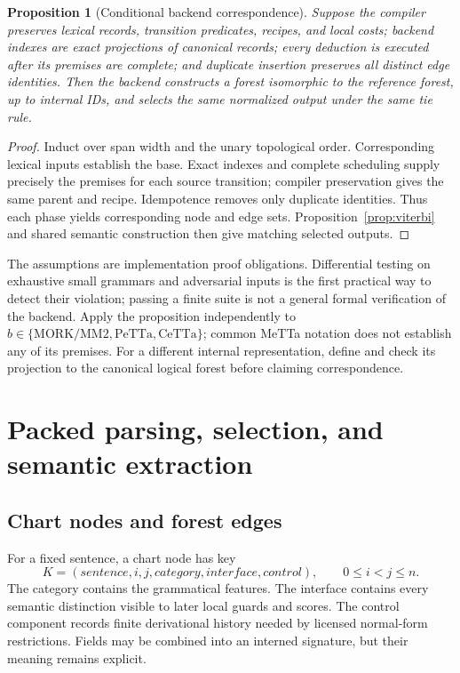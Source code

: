 \documentclass[11pt,a4paper]{article}
\newtheorem{proposition}[definition]{Proposition}
\begin{document}
\begin{proposition}[Conditional backend correspondence]\label{prop:backend}
Suppose the compiler preserves lexical records, transition predicates,
recipes, and local costs; backend indexes are exact projections of canonical
records; every deduction is executed after its premises are complete;
and duplicate insertion preserves all distinct edge identities. Then the
backend constructs a forest isomorphic to the reference forest, up to
internal IDs, and selects the same normalized output under the same tie rule.
\end{proposition}
\begin{proof}
Induct over span width and the unary topological order. Corresponding lexical
inputs establish the base. Exact indexes and complete scheduling supply
precisely the premises for each source transition; compiler preservation
gives the same parent and recipe. Idempotence removes only duplicate
identities. Thus each phase yields corresponding node and edge sets.
Proposition~\ref{prop:viterbi} and shared semantic construction then give
matching selected outputs.
\end{proof}

The assumptions are implementation proof obligations. Differential testing
on exhaustive small grammars and adversarial inputs is the first practical
way to detect their violation; passing a finite suite is not a general formal
verification of the backend. Apply the proposition independently to
\(b\in\{\text{MORK/MM2},\text{PeTTa},\text{CeTTa}\}\); common MeTTa
notation does not establish any of its premises. For a different internal
representation, define and check its projection to the canonical logical
forest before claiming correspondence.

\section{Packed parsing, selection, and semantic extraction}\label{sec:chart}

\subsection{Chart nodes and forest edges}
For a fixed sentence, a chart node has key
\[
  K=(\mathit{sentence},i,j,\mathit{category},
                    \mathit{interface},\mathit{control}),
  \qquad 0\le i<j\le n.
\]
The category contains the grammatical features. The interface contains every
semantic distinction visible to later local guards and scores. The control
component records finite derivational history needed by licensed
normal-form restrictions. Fields may be combined into an interned signature,
but their meaning remains explicit.
\end{document}
